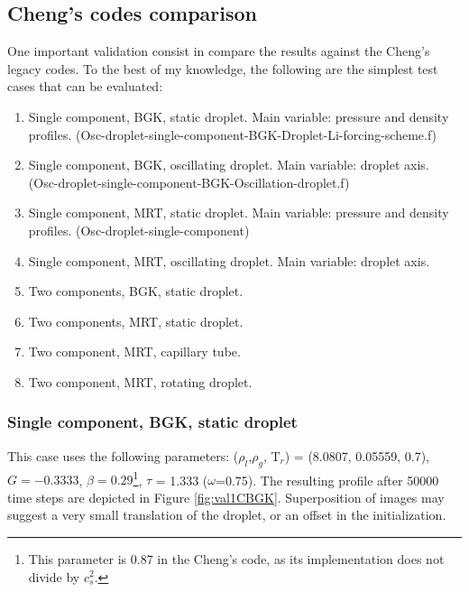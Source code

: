\documentclass{article}
\begin{document}
	\subsection{Cheng's codes comparison}
	One important validation consist in compare the results against the Cheng's legacy codes. To the best of my knowledge, the following are the simplest test cases that can be evaluated:
	\begin{enumerate}
		\item Single component, BGK, static droplet. Main variable: pressure and density profiles. (Osc-droplet-single-component-BGK-Droplet-Li-forcing-scheme.f)
		\item Single component, BGK, oscillating droplet. Main variable: droplet axis. (Osc-droplet-single-component-BGK-Oscillation-droplet.f)
		\item Single component, MRT, static droplet. Main variable: pressure and density profiles. (Osc-droplet-single-component)
		\item Single component, MRT, oscillating droplet. Main variable: droplet axis. 
		\item Two components, BGK, static droplet. 
		\item Two components, MRT, static droplet.
		\item Two component, MRT, capillary tube. 
		\item Two component, MRT, rotating droplet. 
	\end{enumerate}
	
	\subsubsection{Single component, BGK, static droplet}
	
	This case uses the following parameters: ($\rho_l$,$\rho_g$, T$_r$) = (8.0807, 0.05559, 0.7), $G = -0.3333$, $\beta = 0.29$\footnote{This parameter is 0.87 in the Cheng's code, as its implementation does not divide by $c_s^2$.}, $\tau$ = 1.333 ($\omega$=0.75). The resulting profile after 50000 time steps are depicted in Figure \ref{fig:val1CBGK}. Superposition of images may suggest a very small translation of the droplet, or an offset in the initialization.
	
\end{document}
